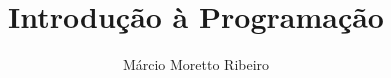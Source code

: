 \documentclass[a4,12pt]{book}
\begin{document}


\author{Márcio Moretto Ribeiro}

\title{Introdução à Programação}

\maketitle

\tableofcontents

















\end{document}
